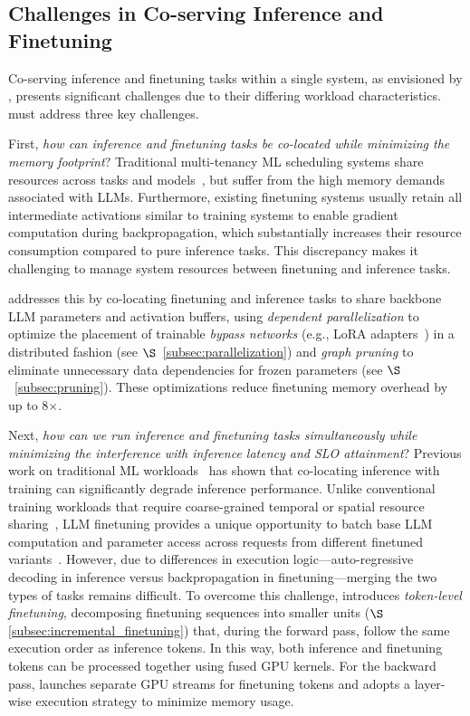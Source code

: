 \subsection{Challenges in Co-serving Inference and Finetuning}
\label{subsec:challenges}
Co-serving inference and finetuning tasks within a single system, as envisioned by \sys, presents significant challenges due to their differing workload characteristics. \Sys must address three key challenges.

First, \emph{how can inference and finetuning tasks be co-located while minimizing the memory footprint}?  
Traditional multi-tenancy ML scheduling systems share resources across tasks and models~\cite{xiao2018gandiva}, but suffer from the high memory demands associated with LLMs.
Furthermore, existing finetuning systems usually retain all intermediate activations similar to training systems to enable gradient computation during backpropagation, which substantially increases their resource consumption compared to pure inference tasks. This discrepancy makes it challenging to manage system resources between finetuning and inference tasks.

\Sys addresses this by co-locating finetuning and inference tasks to share backbone LLM parameters and activation buffers, using {\em dependent parallelization} to optimize the placement of trainable {\em bypass networks} (e.g., LoRA adapters~\cite{hu2021lora}) in a distributed fashion (see $\S$~\ref{subsec:parallelization}) and {\em graph pruning} to eliminate unnecessary data dependencies for frozen parameters (see $\S$~\ref{subsec:pruning}). These optimizations reduce finetuning memory overhead by up to 8$\times$.

Next, \emph{how can we run inference and finetuning tasks simultaneously while minimizing the interference with inference latency and SLO attainment}? 
Previous work on traditional ML workloads~\cite{romero2021infaas} has shown that co-locating inference with training can significantly degrade inference performance.
Unlike conventional training workloads that require coarse-grained temporal or spatial resource sharing~\cite{choi2022serving}, LLM finetuning provides a unique opportunity to batch base LLM computation and parameter access across requests from different finetuned variants~\cite{wu2024dlora}. However, due to differences in execution logic---auto-regressive decoding in inference versus backpropagation in finetuning---merging the two types of tasks remains difficult.
%
To overcome this challenge, \Sys introduces {\em token-level finetuning}, decomposing finetuning sequences into smaller units ($\S$\ref{subsec:incremental_finetuning}) that, during the forward pass, follow the same execution order as inference tokens. In this way, both inference and finetuning tokens can be processed together using fused GPU kernels. For the backward pass, \sys launches separate GPU streams for finetuning tokens and adopts a layer-wise execution strategy to minimize memory usage.

